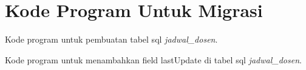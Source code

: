 \chapter{Kode Program Untuk Migrasi}

Kode program untuk pembuatan tabel sql \textit{jadwal\_dosen}.
 

Kode program untuk menambahkan field lastUpdate di tabel sql \textit{jadwal\_dosen}.
 





